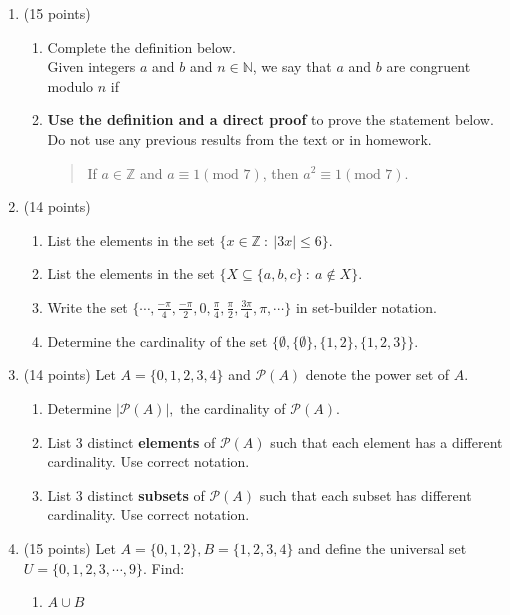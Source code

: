 \documentclass[11pt]{article}
\begin{document}
\begin{enumerate}
\item (15 points)
	\begin{enumerate}
	\item Complete the definition below.\\
	
	Given integers $a$ and $b$ and $n \in \mathbb{N}$, we say that $a$ and $b$ are congruent modulo $n$ if\\
	\vspace{.5in}
	\item \textbf{Use the definition and a direct proof} to prove the statement below. Do not use any previous results from the text or in homework.\\
	\begin{quote} If $a \in \mathbb{Z}$ and $a \equiv 1 (\text{mod } 7)$, then $a^2  \equiv 1 (\text{mod } 7).$ \end{quote}
	\vfill
	\end{enumerate}
\newpage
\item (14 points)
	\begin{enumerate}
	\item List the elements in the set $\{x \in \mathbb{Z} \: : \: |3x| \leq 6 \}.$
	\vfill
	\item List the elements in the set $\{X \subseteq \{a,b,c\} \: : \: a \not \in X\}.$
	\vfill
	\item Write the set $\{ \cdots, \frac{- \pi }{4}, \frac{ -\pi }{2},0,\frac{ \pi }{4},\frac{ \pi }{2},\frac{3 \pi }{4},\pi, \cdots  \}$ in set-builder notation. 
	\vfill
	\item Determine the cardinality of the set $\{ \emptyset, \{\emptyset\}, \{ 1,2\}, \{1,2,3\}\}.$
	\vfill
	\end{enumerate}
\item (14 points) Let $A=\{0,1,2,3,4\}$ and $\mathcal{P}(A)$ denote the power set of $A.$
	\begin{enumerate}
	\item Determine $|\mathcal{P}(A)|,$  the cardinality of $\mathcal{P}(A)$.\\
	
	\item List 3 distinct \textbf{elements} of $\mathcal{P}(A)$ such that each element has a different cardinality. Use correct notation.
	\vfill
	\item List 3 distinct \textbf{subsets} of $\mathcal{P}(A)$ such that each subset has different cardinality. Use correct notation.
	\vfill
	\newpage
	\end{enumerate}
\item (15 points) Let $A=\{0,1,2\}, B=\{1,2,3,4\}$ and define the universal set $U=\{0,1,2,3, \cdots, 9\}$. Find:
	\begin{enumerate}
	\item $A \cup B$\\
	\vspace{.3in}
	

\end{enumerate}
\end{enumerate}
\end{document}

